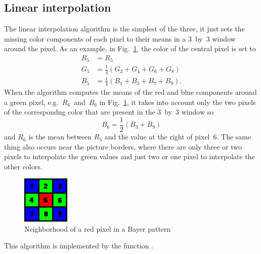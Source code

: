 \documentclass[a4paper,oneside]{article}
\begin{document}
\subsection{Linear interpolation}
The linear interpolation algorithm is the simplest of the three, it
just sets the missing color components of each pixel to their means in
a 3~by~3 window around the pixel.
%
As an example, in Fig.~\ref{fig:bayer_neigh}, the color of the central
pixel is set to
\begin{align*}
  R_5 &= R_5 \\
  G_5 &= \frac{1}{4}\left( G_2 + G_4 + G_6 + G_8 \right) \\
  B_5 &= \frac{1}{4}\left( B_1 + B_3 + B_7 + B_9 \right) .
\end{align*}
When the algorithm computes the means of the red and blue components
around a green pixel, e.g.~$R_6$~and~$B_6$ in
Fig.~\ref{fig:bayer_neigh}, it takes into account only the two pixels
of the correspondng color that are present in the 3~by~3 window so
\begin{equation*}
  B_6 = \frac{1}{2} \left( B_3 + B_9 \right)
\end{equation*}
and $R_6$ is the mean between $R_5$ and the value at the right of
pixel~6.
%
The same thing also occurs near the picture borders, where there are
only three or two pixels to interpolate the green values and just two
or one pixel to interpolate the other colors.
\begin{figure}[htbp]
  \centering
  \includegraphics[width=0.20\textwidth]{include_imgs/bayer_neigh}
  \caption{Neighborhood of a red pixel in a Bayer pattern}
  \label{fig:bayer_neigh}
\end{figure}

This algorithm is implemented by the function
.
\end{document}
